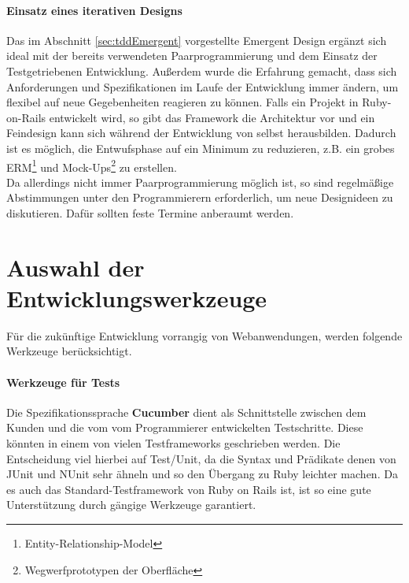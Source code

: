 \paragraph{Einsatz eines iterativen Designs} Das im Abschnitt \ref{sec:tddEmergent} vorgestellte Emergent Design ergänzt sich ideal mit der bereits verwendeten Paarprogrammierung und dem Einsatz der Testgetriebenen Entwicklung. Außerdem wurde die Erfahrung gemacht, dass sich Anforderungen und Spezifikationen im Laufe der Entwicklung immer ändern, um flexibel auf neue Gegebenheiten reagieren zu können. Falls ein Projekt in Ruby-on-Rails entwickelt wird, so gibt das Framework die Architektur vor und ein Feindesign kann sich während der Entwicklung von selbst herausbilden. Dadurch ist es möglich, die Entwufsphase auf ein Minimum zu reduzieren, z.B. ein grobes ERM\footnote{Entity-Relationship-Model} und Mock-Ups\footnote{Wegwerfprototypen der Oberfläche} zu erstellen.\\
Da allerdings nicht immer Paarprogrammierung möglich ist, so sind regelmäßige Abstimmungen unter den Programmierern erforderlich, um neue Designideen zu diskutieren. Dafür sollten feste Termine anberaumt werden.


\section{Auswahl der Entwicklungswerkzeuge}
\label{sec:devtools}

Für die zukünftige Entwicklung vorrangig von Webanwendungen, werden folgende Werkzeuge berücksichtigt.

\paragraph{Werkzeuge für Tests} Die Spezifikationssprache \textbf{Cucumber} dient als Schnittstelle zwischen dem Kunden und die vom vom Programmierer entwickelten Testschritte. Diese könnten in einem von vielen Testframeworks geschrieben werden. Die Entscheidung viel hierbei auf Test/Unit, da die Syntax und Prädikate denen von JUnit und NUnit sehr ähneln und so den Übergang zu Ruby leichter machen. Da es auch das Standard-Testframework von Ruby on Rails ist, ist so eine gute Unterstützung durch gängige Werkzeuge garantiert.

